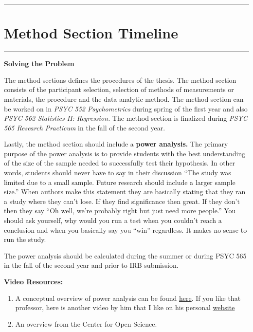 \documentclass[openany]{book}
\begin{document}
\begin{center}\rule{0.5\linewidth}{0.5pt}\end{center}

\hypertarget{method-section-timeline}{%
\section{Method Section Timeline}\label{method-section-timeline}}

\begin{center}\rule{0.5\linewidth}{0.5pt}\end{center}

\textbf{Solving the Problem}

The method sections defines the procedures of the thesis. The method section consists of the participant selection, selection of methods of measurements or materials, the procedure and the data analytic method. The method section can be worked on in \emph{PSYC 552 Psychometrics} during spring of the first year and also \emph{PSYC 562 Statistics II: Regression.} The method section is finalized during \emph{PSYC 565 Research Practicum} in the fall of the second year.

Lastly, the method section should include a \textbf{power analysis.} The primary purpose of the power analysis is to provide students with the best understanding of the size of the sample needed to successfully test their hypothesis. In other words, students should never have to say in their discussion ``The study was limited due to a small sample. Future research should include a larger sample size.'' When authors make this statement they are basically stating that they ran a study where they can't lose. If they find significance then great. If they don't then they say ``Oh well, we're probably right but just need more people.'' You should ask yourself, why would you run a test when you couldn't reach a conclusion and when you basically say you ``win'' regardless. It makes no sense to run the study.

The power analysis should be calculated during the summer or during PSYC 565 in the fall of the second year and prior to IRB submission.

\textbf{Video Resources:}

\begin{enumerate}
\def\labelenumi{\arabic{enumi}.}
\item
  A conceptual overview of power analysis can be found \href{https://www.youtube.com/watch?v=Lr-i4Ugoc5M}{here}. If you like that professor, here is another video by him that I like on his personal \href{https://www.youtube.com/watch?v=XhfkodpyIsw}{website}
\item
  An overview from the Center for Open Science.
\end{enumerate}
\end{document}
